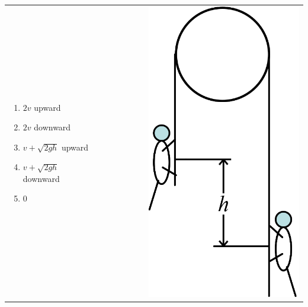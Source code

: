 \documentclass[12pt,letterpaper]{article}
\begin{document}
\begin{enumerate}[resume]
\begin{tabular}{l r}

\begin{minipage}{0.7\textwidth}
\begin{enumerate}
\item $2v$ upward
\item $2v$ downward
\item $v + \sqrt{2gh}$ upward
\item $v + \sqrt{2gh}$ downward
\item 0
\end{enumerate}
\end{minipage} &
\begin{minipage}{0.25\textwidth}
\includegraphics[width=0.75\textwidth,left]{monkey2.png}
\end{minipage}
\end{tabular}


\end{enumerate}
\end{document}
